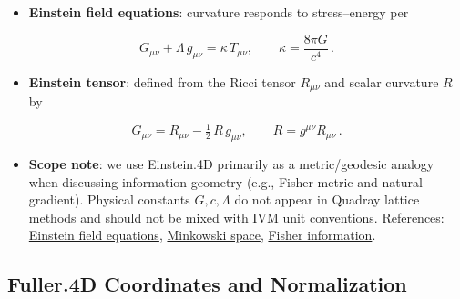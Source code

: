 \documentclass[
  10pt,
]{article}
\providecommand{\tightlist}{%
  \setlength{\itemsep}{0pt}\setlength{\parskip}{0pt}}
\begin{document}
\begin{itemize}
\tightlist
\item
  \textbf{Einstein field equations}: curvature responds to
  stress--energy per
\end{itemize}

\begin{equation}\label{eq:efe}
G_{\mu \nu} + \Lambda\, g_{\mu \nu} = \kappa\, T_{\mu \nu},\qquad \kappa = \frac{8\pi G}{c^4}\,.
\end{equation}

\begin{itemize}
\tightlist
\item
  \textbf{Einstein tensor}: defined from the Ricci tensor \(R_{\mu\nu}\)
  and scalar curvature \(R\) by
\end{itemize}

\begin{equation}\label{eq:einstein_tensor}
G_{\mu \nu} = R_{\mu \nu} - \tfrac{1}{2}\,R\, g_{\mu \nu},\qquad R = g^{\mu\nu} R_{\mu\nu}\,.
\end{equation}

\begin{itemize}
\tightlist
\item
  \textbf{Scope note}: we use Einstein.4D primarily as a metric/geodesic
  analogy when discussing information geometry (e.g., Fisher metric and
  natural gradient). Physical constants \(G,c,\Lambda\) do not appear in
  Quadray lattice methods and should not be mixed with IVM unit
  conventions. References:
  \href{https://en.wikipedia.org/wiki/Einstein_field_equations}{Einstein
  field equations},
  \href{https://en.wikipedia.org/wiki/Minkowski_space}{Minkowski space},
  \href{https://en.wikipedia.org/wiki/Fisher_information}{Fisher
  information}.
\end{itemize}

\hypertarget{fuller.4d-coordinates-and-normalization}{%
\subsection{Fuller.4D Coordinates and
Normalization}\label{fuller.4d-coordinates-and-normalization}}
\end{document}
